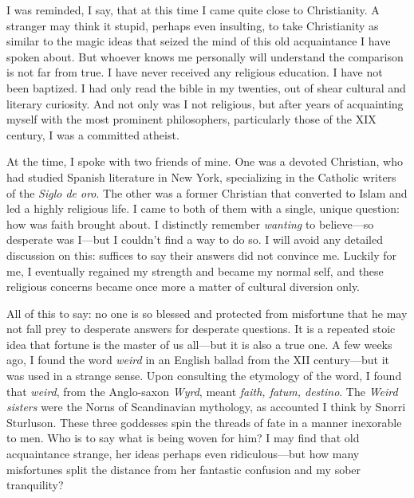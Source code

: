 \documentclass[a4paper]{article}
\begin{document}
I was reminded, I say, that at this time I came quite close to Christianity. A
stranger may think it stupid, perhaps even insulting, to take Christianity as
similar to the magic ideas that seized the mind of this old acquaintance I have
spoken about. But whoever knows me personally will understand the comparison is
not far from true. I have never received any religious education. I have not
been baptized. I had only read the bible in my twenties, out of shear cultural
and literary curiosity. And not only was I not religious, but after years of
acquainting myself with the most prominent philosophers, particularly those of
the XIX century, I was a committed atheist. 

At the time, I spoke with two friends of mine. One was a devoted Christian, who
had studied Spanish literature in New York, specializing in the Catholic
writers of the \textit{Siglo de oro}. The other was a former Christian that
converted to Islam and led a highly religious life. I came to both of them with
a single, unique question: how was faith brought about. I distinctly remember
\textit{wanting} to believe---so desperate was I---but I couldn't find a way to
do so. I will avoid any detailed discussion on this: suffices to say their
answers did not convince me. Luckily for me, I eventually regained my strength
and became my normal self, and these religious concerns became once more a matter
of cultural diversion only.

All of this to say: no one is so blessed and protected from misfortune that he
may not fall prey to desperate answers for desperate questions. It is a repeated
stoic idea that fortune is the master of us all---but it is also a true one. A
few weeks ago, I found the word \textit{weird} in an English ballad from the
XII century---but it was used in a strange sense. Upon consulting the
etymology of the word, I found that \textit{weird}, from the Anglo-saxon
\textit{Wyrd}, meant \textit{faith, fatum, destino}. The \textit{Weird sisters}
were the Norns of Scandinavian mythology, as accounted I think by Snorri
Sturluson. These three goddesses spin the threads of fate in a manner inexorable
to men. Who is to say what is being woven for him? I may find that old
acquaintance strange, her ideas perhaps even ridiculous---but how many
misfortunes split the distance from her fantastic confusion and my sober
tranquility? 
    
\end{document}
